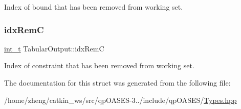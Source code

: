 Index of bound that has been removed from working set. \mbox{\label{struct_tabular_output_a397b625041f77e360cf0801c15923e3e}} 
\subsubsection{\texorpdfstring{idx\+RemC}{idxRemC}}
{\footnotesize\ttfamily \hyperlink{_types_8hpp_ab6fd6105e64ed14a0c9281326f05e623}{int\+\_\+t} Tabular\+Output\+::idx\+RemC}

Index of constraint that has been removed from working set. 

The documentation for this struct was generated from the following file\+:\begin{DoxyCompactItemize}
\item 
/home/zheng/catkin\+\_\+ws/src/qp\+O\+A\+S\+E\+S-\/3../include/qp\+O\+A\+S\+E\+S/\hyperlink{_types_8hpp}{Types.\+hpp}\end{DoxyCompactItemize}
